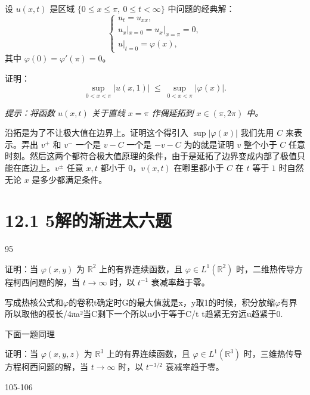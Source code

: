 \begin{homework}[5]
设 $u(x,t)$ 是区域 $\{0\le x\le \pi,\ 0\le t<\infty\}$ 中问题的经典解：
\[
\begin{cases}
u_t=u_{xx},\\[4pt]
u_x|_{x=0}=u_x|_{x=\pi}=0,\\[4pt]
u|_{t=0}=\varphi(x),
\end{cases}
\]
其中 $\varphi(0)=\varphi'(\pi)=0$。

证明：
\[
\sup_{0<x<\pi}|u(x,1)|\ \le\ \sup_{0<x<\pi}|\varphi(x)|.
\]

\textit{提示：将函数 $u(x,t)$ 关于直线 $x=\pi$ 作偶延拓到 $x\in(\pi,2\pi)$ 中。}
\end{homework}

\begin{dxtips}
   沿拓是为了不让极大值在边界上。证明这个得引入 $\sup|\varphi(x)|$ 我们先用 $C$ 来表示。弄出 $v^{+}$ 和 $v^{-}$ 一个是 $v-C$ 一个是 $-v-C$ 为的就是证明 $v$ 整个小于 $C$ 任意时刻。然后这两个都符合极大值原理的条件，由于是延拓了边界变成内部了极值只能在底边上。$v^{\pm}$ 任意 $x,t$ 都小于 $0$，$v(x,t)$ 在哪里都小于 $C$ 在 $t$ 等于 $1$ 时自然无论 $x$ 是多少都满足条件。
\end{dxtips}



   

\section{12.1 5解的渐进太六题}
95

\begin{homework}[2]
证明：当 $\varphi(x,y)$ 为 $\mathbb R^2$ 上的有界连续函数，且 $\varphi\in L^1(\mathbb R^2)$ 时，二维热传导方程柯西问题的解，当 $t\to\infty$ 时，以 $t^{-1}$ 衰减率趋于零。
\end{homework}
\begin{dxtips}
    写成热核公式和$\varphi$的卷积t确定时G的最大值就是x，y取1的时候，积分放缩$\varphi$有界所以取他的模长/4πa²当C剩下一个所以u小于等于C/t t趋紧无穷远u趋紧于0.
\end
{dxtips}
下面一题同理



\begin{homework}[3]
证明：当 $\varphi(x,y,z)$ 为 $\mathbb R^3$ 上的有界连续函数，且 $\varphi\in L^1(\mathbb R^3)$ 时，三维热传导方程柯西问题的解，当 $t\to\infty$ 时，以 $t^{-3/2}$ 衰减率趋于零。
\end{homework}

105-106

